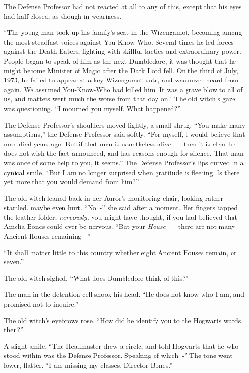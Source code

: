 The Defense Professor had not reacted at all to any of this, except that his eyes had half-closed, as though in weariness.

``The young man took up his family's seat in the Wizengamot, becoming among the most steadfast voices against You-Know-Who. Several times he led forces against the Death Eaters, fighting with skillful tactics and extraordinary power. People began to speak of him as the next Dumbledore, it was thought that he might become Minister of Magic after the Dark Lord fell. On the third of July, 1973, he failed to appear at a key Wizengamot vote, and was never heard from again. We assumed You-Know-Who had killed him. It was a grave blow to all of us, and matters went much the worse from that day on.'' The old witch's gaze was questioning. ``I mourned you myself. What happened?''

The Defense Professor's shoulders moved lightly, a small shrug. ``You make many assumptions,'' the Defense Professor said softly. ``For myself, I would believe that man died years ago. But if that man is nonetheless alive~--- then it is clear he does not wish the fact announced, and has reasons enough for silence. That man was once of some help to you, it seems.'' The Defense Professor's lips curved in a cynical smile. ``But I am no longer surprised when gratitude is fleeting. Is there yet more that you would demand from him?''

The old witch leaned back in her Auror's monitoring-chair, looking rather startled, maybe even hurt. ``No~-'' she said after a moment. Her fingers tapped the leather folder; \emph{nervously,} you might have thought, if you had believed that Amelia Bones could ever be nervous. ``But your \emph{House}~--- there are not many Ancient Houses remaining~-''

``It shall matter little to this country whether eight Ancient Houses remain, or seven.''

The old witch sighed. ``What does Dumbledore think of this?''

The man in the detention cell shook his head. ``He does not know who I am, and promised not to inquire.''

The old witch's eyebrows rose. ``How did he identify you to the Hogwarts wards, then?''

A slight smile. ``The Headmaster drew a circle, and told Hogwarts that he who stood within was the Defense Professor. Speaking of which~-'' The tone went lower, flatter. ``I am missing my classes, Director Bones.''

